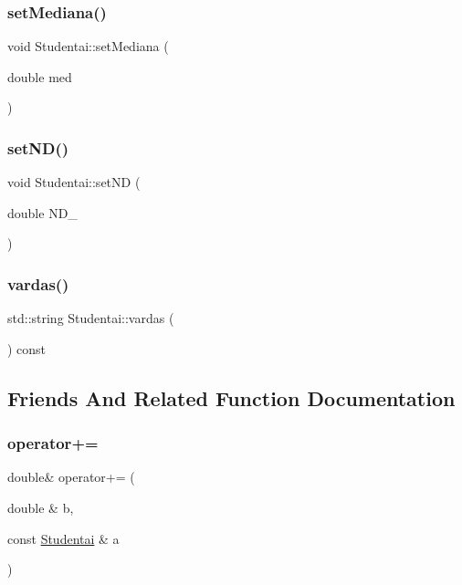 \subsubsection{\texorpdfstring{setMediana()}{setMediana()}}
{\footnotesize\ttfamily void Studentai\+::set\+Mediana (\begin{DoxyParamCaption}\item[{double}]{med }\end{DoxyParamCaption})}

\mbox{\label{class_studentai_af044b7fd795d8df0bf899ca91c82f32d}} 
\subsubsection{\texorpdfstring{setND()}{setND()}}
{\footnotesize\ttfamily void Studentai\+::set\+ND (\begin{DoxyParamCaption}\item[{double}]{N\+D\+\_\+ }\end{DoxyParamCaption})}

\mbox{\label{class_studentai_a9c1d7911e85eac3b260a27dba06067dd}} 
\subsubsection{\texorpdfstring{vardas()}{vardas()}}
{\footnotesize\ttfamily std\+::string Studentai\+::vardas (\begin{DoxyParamCaption}{ }\end{DoxyParamCaption}) const\hspace{0.3cm}{\ttfamily [inline]}}



\subsection{Friends And Related Function Documentation}
\mbox{\label{class_studentai_a8525ba4a0a62f787170476026ab2e661}} 
\subsubsection{\texorpdfstring{operator+=}{operator+=}}
{\footnotesize\ttfamily double\& operator+= (\begin{DoxyParamCaption}\item[{double \&}]{b,  }\item[{const \mbox{\hyperlink{class_studentai}{Studentai}} \&}]{a }\end{DoxyParamCaption})\hspace{0.3cm}{\ttfamily [friend]}}

